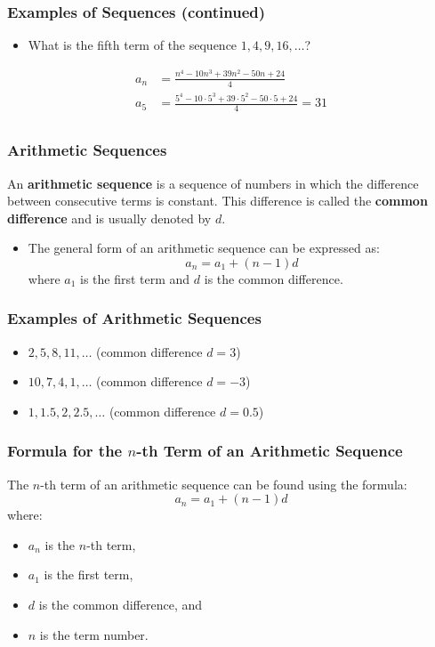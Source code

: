 \begin{frame}
    \frametitle{Examples of Sequences (continued)}
    \begin{itemize}
        \item What is the fifth term of the sequence \(1, 4, 9, 16, \ldots\)?
    \end{itemize}
    \pause 
    \begin{solutionblock}
        \begin{align*}
            a_{n} &= \frac{n^{4} - 10n^{3}+ 39n^{2} - 50n + 24}{4} \\
            a_{5} &= \frac{5^{4} - 10 \cdot 5^{3} + 39 \cdot 5^{2} - 50 \cdot 5 + 24}{4} = 31 \\
        \end{align*}
    \end{solutionblock}    
\end{frame}

\begin{frame}
    \frametitle{Arithmetic Sequences}
    \begin{definition}
        An \textbf{arithmetic sequence} is a sequence of numbers in which the difference between consecutive terms is constant. This difference is called the \textbf{common difference} and is usually denoted by \(d\).
    \end{definition}
    \begin{itemize}
        \item The general form of an arithmetic sequence can be expressed as:
        \[
            a_n = a_1 + (n-1)d
        \]
        where \(a_1\) is the first term and \(d\) is the common difference.
    \end{itemize}
\end{frame}

\begin{frame}
    \frametitle{Examples of Arithmetic Sequences}
    \begin{itemize}
        \item \(2, 5, 8, 11, \ldots\) (common difference \(d = 3\))
        \item \(10, 7, 4, 1, \ldots\) (common difference \(d = -3\))
        \item \(1, 1.5, 2, 2.5, \ldots\) (common difference \(d = 0.5\))
    \end{itemize}
\end{frame}

\begin{frame}
    \frametitle{Formula for the \(n\)-th Term of an Arithmetic Sequence}
    The \(n\)-th term of an arithmetic sequence can be found using the formula:
    \[
        a_n = a_1 + (n-1)d
    \]
    where:
    \begin{itemize}
        \item \(a_n\) is the \(n\)-th term,
        \item \(a_1\) is the first term,
        \item \(d\) is the common difference, and
        \item \(n\) is the term number.
    \end{itemize}
\end{frame}

